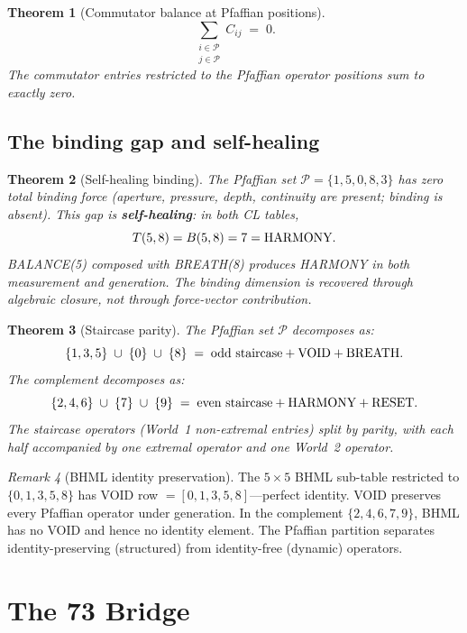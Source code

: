 \documentclass[11pt]{article}
\newtheorem{theorem}{Theorem}[section]
\theoremstyle{definition}
\theoremstyle{remark}
\newtheorem{remark}[theorem]{Remark}
\begin{document}
\begin{theorem}[Commutator balance at Pfaffian positions]
\label{thm:comm-balance}
\[
  \sum_{\substack{i \in \mathcal{P} \\ j \in \mathcal{P}}} C_{ij}
  \;=\; 0.
\]
The commutator entries restricted to the Pfaffian operator positions sum to
exactly zero.
\end{theorem}

\subsection{The binding gap and self-healing}

\begin{theorem}[Self-healing binding]
\label{thm:self-healing}
The Pfaffian set $\mathcal{P} = \{1,5,0,8,3\}$ has zero total binding force
(aperture, pressure, depth, continuity are present; binding is absent).  This
gap is \textbf{self-healing}: in both CL tables,
\[
  T(5,8) = B(5,8) = 7 = \textup{HARMONY}.
\]
BALANCE(5) composed with BREATH(8) produces HARMONY in both measurement and
generation.  The binding dimension is recovered through algebraic closure, not
through force-vector contribution.
\end{theorem}

\begin{theorem}[Staircase parity]
\label{thm:parity}
The Pfaffian set $\mathcal{P}$ decomposes as:
\[
  \{1,3,5\} \;\cup\; \{0\} \;\cup\; \{8\}
  \;=\; \textup{odd staircase} + \textup{VOID} + \textup{BREATH}.
\]
The complement decomposes as:
\[
  \{2,4,6\} \;\cup\; \{7\} \;\cup\; \{9\}
  \;=\; \textup{even staircase} + \textup{HARMONY} + \textup{RESET}.
\]
The staircase operators (World~1 non-extremal entries) split by parity, with
each half accompanied by one extremal operator and one World~2 operator.
\end{theorem}

\begin{remark}[BHML identity preservation]
The $5 \times 5$ BHML sub-table restricted to $\{0,1,3,5,8\}$ has VOID
row $= [0, 1, 3, 5, 8]$---perfect identity.  VOID preserves every Pfaffian
operator under generation.  In the complement $\{2,4,6,7,9\}$, BHML has no
VOID and hence no identity element.  The Pfaffian partition separates
identity-preserving (structured) from identity-free (dynamic) operators.
\end{remark}

\section{The 73 Bridge}
\label{sec:73-bridge}
\end{document}
